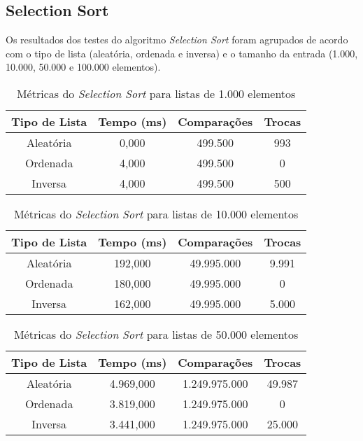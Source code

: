 \documentclass[a4paper,12pt]{article}
\begin{document}
\newpage

\subsection{Selection Sort}

Os resultados dos testes do algoritmo \textit{Selection Sort} foram agrupados de acordo com o tipo de lista (aleatória, ordenada e inversa) e o tamanho da entrada (1.000, 10.000, 50.000 e 100.000 elementos).

\begin{table}[H]
\centering
\caption{Métricas do \textit{Selection Sort} para listas de 1.000 elementos}
\begin{tabular}{|c|c|c|c|}
\hline
\textbf{Tipo de Lista} & \textbf{Tempo (ms)} & \textbf{Comparações} & \textbf{Trocas} \\ \hline
Aleatória              & 0,000               & 499.500              & 993             \\ \hline
Ordenada               & 4,000               & 499.500              & 0               \\ \hline
Inversa                & 4,000               & 499.500              & 500             \\ \hline
\end{tabular}
\end{table}

\begin{table}[H]
\centering
\caption{Métricas do \textit{Selection Sort} para listas de 10.000 elementos}
\begin{tabular}{|c|c|c|c|}
\hline
\textbf{Tipo de Lista} & \textbf{Tempo (ms)} & \textbf{Comparações} & \textbf{Trocas} \\ \hline
Aleatória              & 192,000             & 49.995.000           & 9.991           \\ \hline
Ordenada               & 180,000             & 49.995.000           & 0               \\ \hline
Inversa                & 162,000             & 49.995.000           & 5.000           \\ \hline
\end{tabular}
\end{table}

\begin{table}[H]
\centering
\caption{Métricas do \textit{Selection Sort} para listas de 50.000 elementos}
\begin{tabular}{|c|c|c|c|}
\hline
\textbf{Tipo de Lista} & \textbf{Tempo (ms)} & \textbf{Comparações} & \textbf{Trocas} \\ \hline
Aleatória              & 4.969,000           & 1.249.975.000        & 49.987          \\ \hline
Ordenada               & 3.819,000           & 1.249.975.000        & 0               \\ \hline
Inversa                & 3.441,000           & 1.249.975.000        & 25.000          \\ \hline
\end{tabular}
\end{table}
\end{document}
